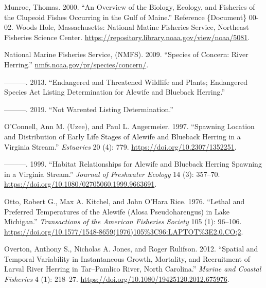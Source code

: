 \documentclass[
]{book}
\newlength{\cslhangindent}
\newlength{\cslentryspacingunit} %
\newenvironment{CSLReferences}[2] %
 {%
  \setlength{\parindent}{0pt}
  \ifodd #1
  \let\oldpar\par
  \def\par{\hangindent=\cslhangindent\oldpar}
  \fi
  \setlength{\parskip}{#2\cslentryspacingunit}
 }%
 {}
\begin{document}
\begin{CSLReferences}{1}{0}
\leavevmode{}%
Munroe, Thomas. 2000. {``An Overview of the Biology, Ecology, and Fisheries of the Clupeoid Fishes Occurring in the {Gulf} of {Maine}.''} Reference \{Document\} 00-02. Woods Hole, Massachusetts: National Matine Fisheries Service, Northeast Fisheries Science Center. \url{https://repository.library.noaa.gov/view/noaa/5081}.

\leavevmode{}%
National Marine Fisheries Service, (NMFS). 2009. {``Species of Concern: River Herring.''} \href{https://nmfs.noaa.gov/pr/species/concern/}{nmfs.noaa.gov/pr/species/concern/}.

\leavevmode{}%
---------. 2013. {``Endangered and Threatened Wildlife and Plants; Endangered Species Act Listing Determination for Alewife and Blueback Herring.''}

\leavevmode{}%
---------. 2019. {``Not {Warented} {Listing} {Determination}.''}

\leavevmode{}%
O'Connell, Ann M. (Uzee), and Paul L. Angermeier. 1997. {``Spawning {Location} and {Distribution} of {Early} {Life} {Stages} of {Alewife} and {Blueback} {Herring} in a {Virginia} {Stream}.''} \emph{Estuaries} 20 (4): 779. \url{https://doi.org/10.2307/1352251}.

\leavevmode{}%
---------. 1999. {``Habitat {Relationships} for {Alewife} and {Blueback} {Herring} {Spawning} in a {Virginia} {Stream}.''} \emph{Journal of Freshwater Ecology} 14 (3): 357--70. \url{https://doi.org/10.1080/02705060.1999.9663691}.

\leavevmode{}%
Otto, Robert G., Max A. Kitchel, and John O'Hara Rice. 1976. {``Lethal and {Preferred} {Temperatures} of the {Alewife} ({Alosa} Pseudoharengus) in {Lake} {Michigan}.''} \emph{Transactions of the American Fisheries Society} 105 (1): 96--106. \url{https://doi.org/10.1577/1548-8659(1976)105\%3C96:LAPTOT\%3E2.0.CO;2}.

\leavevmode{}%
Overton, Anthony S., Nicholas A. Jones, and Roger Rulifson. 2012. {``Spatial and {Temporal} {Variability} in {Instantaneous} {Growth}, {Mortality}, and {Recruitment} of {Larval} {River} {Herring} in {Tar}--{Pamlico} {River}, {North} {Carolina}.''} \emph{Marine and Coastal Fisheries} 4 (1): 218--27. \url{https://doi.org/10.1080/19425120.2012.675976}.


\end{CSLReferences}
\end{document}
